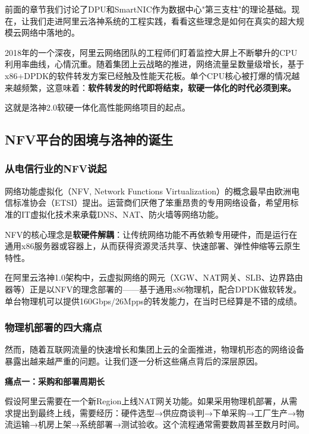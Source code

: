 前面的章节我们讨论了DPU和SmartNIC作为数据中心"第三支柱"的理论基础。现在，让我们走进阿里云洛神系统的工程实践，看看这些理念是如何在真实的超大规模云网络中落地的。

2018年的一个深夜，阿里云网络团队的工程师们盯着监控大屏上不断攀升的CPU利用率曲线，心情沉重。随着集团上云战略的推进，网络流量呈数量级增长，基于x86+DPDK的软件转发方案已经触及性能天花板。单个CPU核心被打爆的情况越来越频繁，这意味着：\textbf{软件转发的时代即将结束，软硬一体化的时代必须到来。}

这就是洛神2.0软硬一体化高性能网络项目的起点。

\subsection{NFV平台的困境与洛神的诞生}

\subsubsection{从电信行业的NFV说起}

网络功能虚拟化（NFV, Network Functions Virtualization）的概念最早由欧洲电信标准协会（ETSI）提出。运营商们厌倦了笨重昂贵的专用网络设备，希望用标准的IT虚拟化技术来承载DNS、NAT、防火墙等网络功能。

NFV的核心理念是\textbf{软硬件解耦}：让传统网络功能不再依赖专用硬件，而是运行在通用x86服务器或容器上，从而获得资源灵活共享、快速部署、弹性伸缩等云原生特性。

在阿里云洛神1.0架构中，云虚拟网络的网元（XGW、NAT网关、SLB、边界路由器等）正是以NFV的理念部署的——基于通用x86物理机，配合DPDK做软转发。单台物理机可以提供160Gbps/26Mpps的转发能力，在当时已经算是不错的成绩。

\subsubsection{物理机部署的四大痛点}

然而，随着互联网流量的快速增长和集团上云的全面推进，物理机形态的网络设备暴露出越来越严重的问题。让我们逐一分析这些痛点背后的深层原因。

\textbf{痛点一：采购和部署周期长}

假设阿里云需要在一个新Region上线NAT网关功能。如果采用物理机部署，从需求提出到最终上线，需要经历：硬件选型→供应商谈判→下单采购→工厂生产→物流运输→机房上架→系统部署→测试验收。这个流程通常需要数周甚至数月时间。

